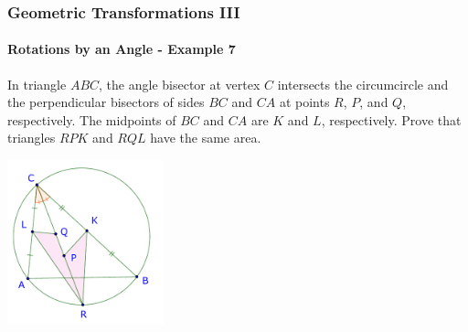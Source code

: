 \documentclass[8pt,xcolor=table,dvipsnames]{beamer}
\begin{document}
\begin{frame}[t]
    \frametitle{Geometric Transformations III}
    \framesubtitle{Rotations by an Angle - Example 7}
    \begin{example}
        In triangle $ABC$, the angle bisector at vertex $C$ intersects the circumcircle
        and the perpendicular bisectors of sides $BC$ and $CA$ at points $R$, $P$, and $Q$, respectively.
        The midpoints of $BC$ and $CA$ are $K$ and $L$, respectively.
        \bigbreak
        Prove that triangles $RPK$ and $RQL$ have the same area.
    \end{example}

    \begin{center}
        \includegraphics[width=4.5cm]{./svg/pdf/imo-2007-4.pdf}
    \end{center}
\end{frame}
\end{document}
